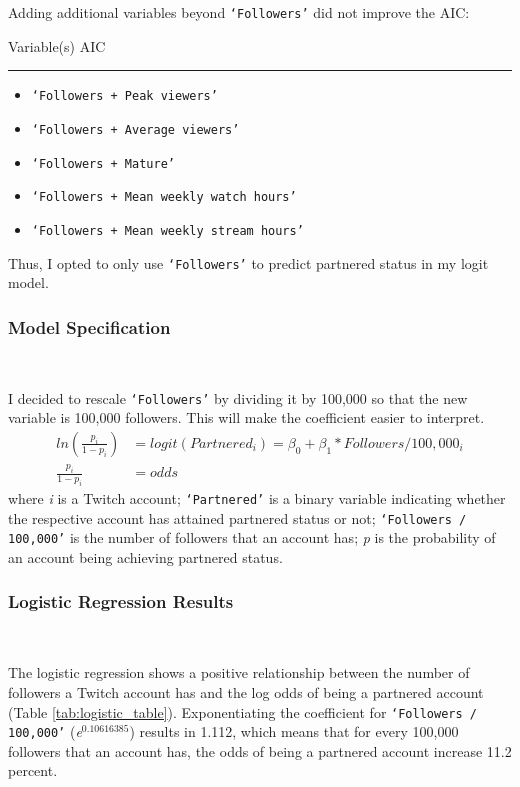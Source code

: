 \documentclass[12pt]{article}
\begin{document}
\noindent Adding additional variables beyond \texttt{`Followers'} did not improve the AIC:

\noindent Variable(s) \hfill AIC 
\hspace{0.4em}
\hrule
\begin{itemize}
    \item \texttt{`Followers + Peak viewers'} 
    \item \texttt{`Followers + Average viewers'} 
    \item \texttt{`Followers + Mature'} 
    \item \texttt{`Followers + Mean weekly watch hours'} 
    \item \texttt{`Followers + Mean weekly stream hours'} 
\end{itemize}
Thus, I opted to only use \texttt{`Followers'} to predict partnered status in my logit model.

\subsubsection{Model Specification}\

I decided to rescale \texttt{`Followers'} by dividing it by 100,000 so that the new variable is 100,000 followers. This will make the coefficient easier to interpret.
\begin{equation}
\begin{aligned}
	ln(\frac{p_{i}}{1-p_{i}}) & = logit(Partnered_{i})  = \beta_{0} + \beta_{1} \ast Followers/100,000_{i} \\
	\frac{p_{i}}{1-p_{i}} & = odds
\end{aligned}
\end{equation}
where \emph{i} is a Twitch account; \texttt{`Partnered'} is a binary variable indicating whether the respective account has attained partnered status or not; \texttt{`Followers / 100,000'} is the number of followers that an account has; \emph{p} is the probability of an account being achieving partnered status.

\subsubsection{Logistic Regression Results}\

The logistic regression shows a positive relationship between the number of followers a Twitch account has and the log odds of being a partnered account (Table \ref{tab:logistic_table}). Exponentiating the coefficient for \texttt{`Followers / 100,000'} (\emph{e}$^{0.10616385}$)  results in 1.112, which means that for every 100,000 followers that an account has, the odds of being a partnered account increase 11.2 percent.
\end{document}
